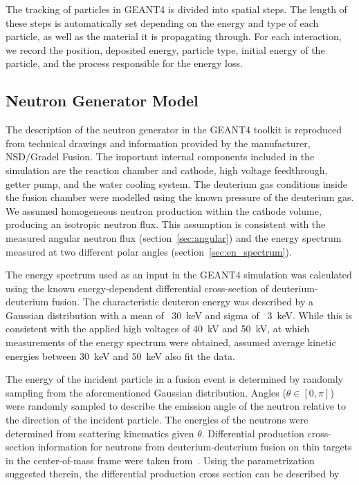 The tracking of particles in GEANT4 is divided into spatial steps. The length of these steps is automatically set depending on the energy and type of each particle, as well as the material it is propagating through. For each interaction, we record the position, deposited energy, particle type, initial energy of the particle, and the process responsible for the energy loss.

\subsection{Neutron Generator Model}\label{sec:initialneutronspectrum}

The description of the neutron generator in the GEANT4 toolkit is reproduced from technical drawings and information provided by the manufacturer, NSD/Gradel Fusion. The important internal components included in the simulation are the reaction chamber and cathode, high voltage feedthrough, getter pump, and the water cooling system. The deuterium gas conditions inside the fusion chamber were modelled using the known pressure of the deuterium gas. We assumed homogeneous neutron production within the cathode volume, producing an isotropic neutron flux. This assumption is consistent with the measured angular neutron flux (section~\ref{sec:angular}) and the energy spectrum measured at two different polar angles (section~\ref{sec:en_spectrum}).

The energy spectrum used as an input in the GEANT4 simulation was calculated using the known energy-dependent differential cross-section of deuterium-deuterium fusion. The characteristic deuteron energy was described by a Gaussian distribution with a mean of ~\SI{30}{keV} and sigma of ~\SI{3}{keV}. While this is consistent with the applied high voltages of \SI{40}{kV} and \SI{50}{kV}, at which measurements of the energy spectrum were obtained, assumed average kinetic energies between \SI{30}{keV} and \SI{50}{keV} also fit the data.

The energy of the incident particle in a fusion event is determined by randomly sampling from the aforementioned Gaussian distribution. Angles ($\theta \in [0, \pi]$) were randomly sampled to describe the emission angle of the neutron relative to the direction of the incident particle. The energies of the neutrons were determined from scattering kinematics given $\theta$. Differential production cross-section information for neutrons from deuterium-deuterium fusion on thin targets in the center-of-mass frame were taken from~\cite{LISKIEN1973569}. Using the parametrization suggested therein, the differential production cross section can be described by

